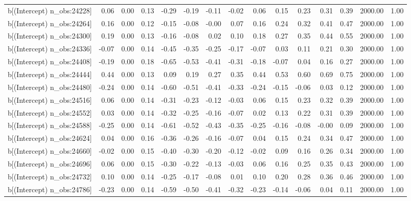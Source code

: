 \begin{table}[ht]
\begin{tabular}{rrrrrrrrrrrrrrr}
  b[(Intercept) n\_obs:24228] & 0.06 & 0.00 & 0.13 & -0.29 & -0.19 & -0.11 & -0.02 & 0.06 & 0.15 & 0.23 & 0.31 & 0.39 & 2000.00 & 1.00 \\ 
  b[(Intercept) n\_obs:24264] & 0.16 & 0.00 & 0.12 & -0.15 & -0.08 & -0.00 & 0.07 & 0.16 & 0.24 & 0.32 & 0.41 & 0.47 & 2000.00 & 1.00 \\ 
  b[(Intercept) n\_obs:24300] & 0.19 & 0.00 & 0.13 & -0.16 & -0.08 & 0.02 & 0.10 & 0.18 & 0.27 & 0.35 & 0.44 & 0.55 & 2000.00 & 1.00 \\ 
  b[(Intercept) n\_obs:24336] & -0.07 & 0.00 & 0.14 & -0.45 & -0.35 & -0.25 & -0.17 & -0.07 & 0.03 & 0.11 & 0.21 & 0.30 & 2000.00 & 1.00 \\ 
  b[(Intercept) n\_obs:24408] & -0.19 & 0.00 & 0.18 & -0.65 & -0.53 & -0.41 & -0.31 & -0.18 & -0.07 & 0.04 & 0.16 & 0.27 & 2000.00 & 1.00 \\ 
  b[(Intercept) n\_obs:24444] & 0.44 & 0.00 & 0.13 & 0.09 & 0.19 & 0.27 & 0.35 & 0.44 & 0.53 & 0.60 & 0.69 & 0.75 & 2000.00 & 1.00 \\ 
  b[(Intercept) n\_obs:24480] & -0.24 & 0.00 & 0.14 & -0.60 & -0.51 & -0.41 & -0.33 & -0.24 & -0.15 & -0.06 & 0.03 & 0.12 & 2000.00 & 1.00 \\ 
  b[(Intercept) n\_obs:24516] & 0.06 & 0.00 & 0.14 & -0.31 & -0.23 & -0.12 & -0.03 & 0.06 & 0.15 & 0.23 & 0.32 & 0.39 & 2000.00 & 1.00 \\ 
  b[(Intercept) n\_obs:24552] & 0.03 & 0.00 & 0.14 & -0.32 & -0.25 & -0.16 & -0.07 & 0.02 & 0.13 & 0.22 & 0.31 & 0.39 & 2000.00 & 1.00 \\ 
  b[(Intercept) n\_obs:24588] & -0.25 & 0.00 & 0.14 & -0.61 & -0.52 & -0.43 & -0.35 & -0.25 & -0.16 & -0.08 & -0.00 & 0.09 & 2000.00 & 1.00 \\ 
  b[(Intercept) n\_obs:24624] & 0.04 & 0.00 & 0.16 & -0.36 & -0.26 & -0.16 & -0.07 & 0.04 & 0.15 & 0.24 & 0.34 & 0.47 & 2000.00 & 1.00 \\ 
  b[(Intercept) n\_obs:24660] & -0.02 & 0.00 & 0.15 & -0.40 & -0.30 & -0.20 & -0.12 & -0.02 & 0.09 & 0.16 & 0.26 & 0.34 & 2000.00 & 1.00 \\ 
  b[(Intercept) n\_obs:24696] & 0.06 & 0.00 & 0.15 & -0.30 & -0.22 & -0.13 & -0.03 & 0.06 & 0.16 & 0.25 & 0.35 & 0.43 & 2000.00 & 1.00 \\ 
  b[(Intercept) n\_obs:24732] & 0.10 & 0.00 & 0.14 & -0.25 & -0.17 & -0.08 & 0.01 & 0.10 & 0.20 & 0.28 & 0.36 & 0.46 & 2000.00 & 1.00 \\ 
  b[(Intercept) n\_obs:24786] & -0.23 & 0.00 & 0.14 & -0.59 & -0.50 & -0.41 & -0.32 & -0.23 & -0.14 & -0.06 & 0.04 & 0.11 & 2000.00 & 1.00 \\ 

\end{tabular}
\end{table}
